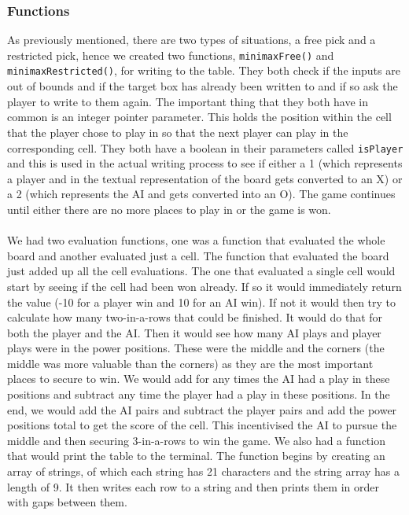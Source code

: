 \documentclass[10pt]{article}
\begin{document}
\subsubsection{Functions}
As previously mentioned, there are two types of situations, a free pick and a restricted pick, hence we created two functions, {\tt{minimaxFree()}} and {\tt{minimaxRestricted()}}, for writing to the table. They both check if the inputs are out of bounds and if the target box has already been written to and if so ask the player to write to them again. The important thing that they both have in common is an integer pointer parameter. This holds the position within the cell that the player chose to play in so that the next player can play in the corresponding cell. They both have a boolean in their parameters called {\tt{isPlayer}} and this is used in the actual writing process to see if either a 1 (which represents a player and in the textual representation of the board gets converted to an X) or a 2 (which represents the AI and gets converted into an O).
The game continues until either there are no more places to play in or the game is won.
\\\\We had two evaluation functions, one was a function that evaluated the whole board and another evaluated just a cell. The function that evaluated the board just added up all the cell evaluations. The one that evaluated a single cell would start by seeing if the cell had been won already. If so it would immediately return the value (-10 for a player win and 10 for an AI win). If not it would then try to calculate how many two-in-a-rows that could be finished. It would do that for both the player and the AI. Then it would see how many AI plays and player plays were in the power positions. These were the middle and the corners (the middle was more valuable than the corners) as they are the most important places to secure to win. We would add for any times the AI had a play in these positions and subtract any time the player had a play in these positions. In the end, we would add the AI pairs and subtract the player pairs and add the power positions total to get the score of the cell. This incentivised the AI to pursue the middle and then securing 3-in-a-rows to win the game.
We also had a function that would print the table to the terminal. The function begins by creating an array of strings, of which each string has 21 characters and the string array has a length of 9. It then writes each row to a string and then prints them in order with gaps between them.
\end{document}
